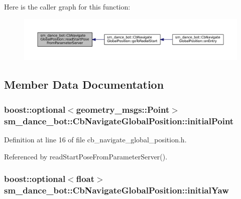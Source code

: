 Here is the caller graph for this function\+:
\nopagebreak
\begin{figure}[H]
\begin{center}
\leavevmode
\includegraphics[width=350pt]{classsm__dance__bot_1_1CbNavigateGlobalPosition_aa081de6b798e53e4fd0a4b86e55635b5_icgraph}
\end{center}
\end{figure}




\subsection{Member Data Documentation}
\subsubsection[{\texorpdfstring{initial\+Point}{initialPoint}}]{\setlength{\rightskip}{0pt plus 5cm}boost\+::optional$<$geometry\+\_\+msgs\+::\+Point$>$ sm\+\_\+dance\+\_\+bot\+::\+Cb\+Navigate\+Global\+Position\+::initial\+Point}\hypertarget{classsm__dance__bot_1_1CbNavigateGlobalPosition_a9b81342ca5492d3b9724c488c1f39f4f}{}\label{classsm__dance__bot_1_1CbNavigateGlobalPosition_a9b81342ca5492d3b9724c488c1f39f4f}


Definition at line 16 of file cb\+\_\+navigate\+\_\+global\+\_\+position.\+h.



Referenced by read\+Start\+Pose\+From\+Parameter\+Server().

\subsubsection[{\texorpdfstring{initial\+Yaw}{initialYaw}}]{\setlength{\rightskip}{0pt plus 5cm}boost\+::optional$<$float$>$ sm\+\_\+dance\+\_\+bot\+::\+Cb\+Navigate\+Global\+Position\+::initial\+Yaw}\hypertarget{classsm__dance__bot_1_1CbNavigateGlobalPosition_ad7ac13ee1b0f1a5dfdd47639930ab34c}{}\label{classsm__dance__bot_1_1CbNavigateGlobalPosition_ad7ac13ee1b0f1a5dfdd47639930ab34c}



